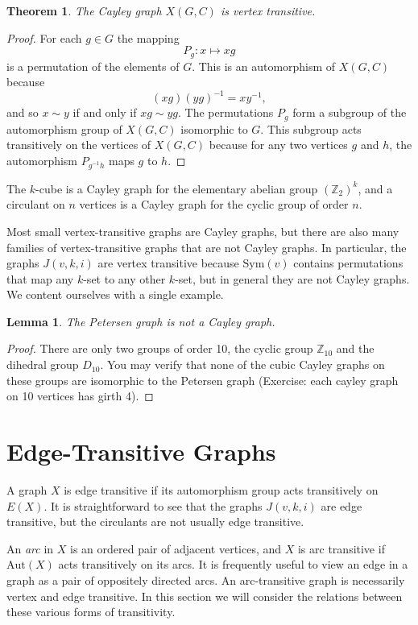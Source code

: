 \documentclass[12pt,a4paper,openany]{book}
\newtheorem{theorem}{Theorem}[section]
\newtheorem{lemma}{Lemma}[section]
\begin{document}
\begin{theorem}
The Cayley graph $X(G, C)$ is vertex transitive.
\end{theorem}

\begin{proof}
For each $g \in G$ the mapping
\[
P_g : x \mapsto xg
\]
is a permutation of the elements of $G$. This is an automorphism of $X(G, C)$ because
\[
(xg)(yg)^{-1} = x y^{-1},
\]
and so $x \sim y$ if and only if $xg \sim yg$. The permutations $P_g$ form a subgroup of the automorphism group of $X(G, C)$ isomorphic to $G$. This subgroup acts transitively on the vertices of $X(G, C)$ because for any two vertices $g$ and $h$, the automorphism $P_{g^{-1}h}$ maps $g$ to $h$.
\end{proof}

The $k$-cube is a Cayley graph for the elementary abelian group $(\mathbb{Z}_2)^k$, and a circulant on $n$ vertices is a Cayley graph for the cyclic group of order $n$.

Most small vertex-transitive graphs are Cayley graphs, but there are also many families of vertex-transitive graphs that are not Cayley graphs. In particular, the graphs $J(v, k, i)$ are vertex transitive because $\text{Sym}(v)$ contains permutations that map any $k$-set to any other $k$-set, but in general they are not Cayley graphs. We content ourselves with a single example.

\begin{lemma}
The Petersen graph is not a Cayley graph.
\end{lemma}

\begin{proof}
There are only two groups of order 10, the cyclic group $\mathbb{Z}_{10}$ and the dihedral group $D_{10}$. You may verify that none of the cubic Cayley graphs on these groups are isomorphic to the Petersen graph (Exercise: each cayley graph on 10 vertices has girth 4).
\end{proof}



\section{Edge-Transitive Graphs}

A graph $X$ is edge transitive if its automorphism group acts transitively on $E(X)$. It is straightforward to see that the graphs $J(v, k, i)$ are edge transitive, but the circulants are not usually edge transitive.

An \emph{arc} in $X$ is an ordered pair of adjacent vertices, and $X$ is arc transitive if $\text{Aut}(X)$ acts transitively on its arcs. It is frequently useful to view an edge in a graph as a pair of oppositely directed arcs. An arc-transitive graph is necessarily vertex and edge transitive. In this section we will consider the relations between these various forms of transitivity.
\end{document}
